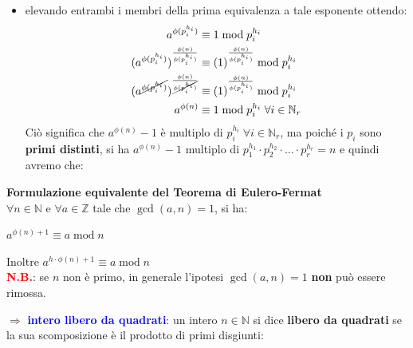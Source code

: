 \begin{flushleft}
\begin{boxA}
\begin{itemize}[nosep]
            {\centering
            \par}
            \item elevando entrambi i membri della prima equivalenza a tale esponente ottendo:
            \begin{align*}
                a^{\phi(p_i^{h_i})} &\equiv 1 \; \text{mod} \; p_i^{h_i} \\
                (a^{\phi(p_i^{h_i})})^{\frac{\phi(n)}{\phi(p_i^{h_i})}} &\equiv (1)^{\frac{\phi(n)}{\phi(p_i^{h_i})}} \; \text{mod} \; p_i^{h_i} \\
                (a^{\cancel{\phi(p_i^{h_i})}})^{\frac{\phi(n)}{\cancel{\phi(p_i^{h_i})}}} &\equiv (1)^{\frac{\phi(n)}{\phi(p_i^{h_i})}} \; \text{mod} \; p_i^{h_i} \\
                a^{\phi(n)} &\equiv 1 \; \text{mod} \; p_i^{h_i} \; \forall i \in \mathbb{N}_r
            \end{align*}
            Ciò significa che $a^{\phi(n)} - 1$ è multiplo di $p_i^{h_i} \; \forall i \in \mathbb{N}_r$, ma poiché i $p_i$ sono \textbf{primi distinti}, si ha $a^{\phi(n)} - 1$ multiplo di $p_1^{h_1} \cdot p_2^{h_2} \cdot ... \cdot p_r^{h_r} = n$ e quindi avremo che:

            {\centering
            \par}
        \end{itemize}
    \end{boxA}

    \textbf{Formulazione equivalente del Teorema di Eulero-Fermat} \\
    $\forall n \in \mathbb{N}$ e $\forall a \in \mathbb{Z}$ tale che $\gcd (a, n) = 1$, si ha:
    
    {\centering
        $a^{\phi(n) + 1} \equiv a \; \text{mod} \; n$
    \par}
    Inoltre $a^{h \cdot \phi(n) + 1} \equiv a \; \text{mod} \; n$ \\
    \textcolor{red}{\textbf{N.B.}}: se $n$ non è primo, in generale l'ipotesi $\gcd (a, n) = 1$ \textbf{non} può essere rimossa.

    $\Longrightarrow$ \textcolor{blue}{\textbf{intero libero da quadrati}}: un intero $n \in \mathbb{N}$ si dice \textbf{libero da quadrati} se la sua scomposizione è il prodotto di primi disgiunti: 
\end{flushleft}

